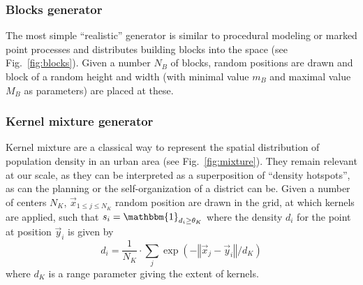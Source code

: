 \documentclass[letterpaper]{article}
\newcommand{\norm}[1]{\left\Vert #1\right\Vert}
\begin{document}



\subsubsection{Blocks generator}

The most simple ``realistic'' generator is similar to procedural modeling or marked point processes and distributes building blocks into the space (see Fig.~\ref{fig:blocks}). Given a number $N_B$ of blocks, random positions are drawn and block of a random height and width (with minimal value $m_B$ and maximal value $M_B$ as parameters) are placed at these.


\subsubsection{Kernel mixture generator}

Kernel mixture are a classical way to represent the spatial distribution of population density in an urban area \citep{anas1998urban} (see Fig.~\ref{fig:mixture}). They remain relevant at our scale, as they can be interpreted as a superposition of ``density hotspots'', as can the planning or the self-organization of a district can be. Given a number of centers $N_K$, $\vec{x}_{1\leq j \leq N_K}$ random position are drawn in the grid, at which kernels are applied, such that $s_i = \mathbbm{1}_{d_i \geq \theta_K}$ where the density $d_i$ for the point at position $\vec{y}_i$ is given by
\begin{equation}
    d_i = \frac{1}{N_K}\cdot \sum_j \exp{\left(-\norm{\vec{x}_j - \vec{y}_i}/d_K\right)} 
\end{equation}
where $d_K$ is a range parameter giving the extent of kernels.
\end{document}
